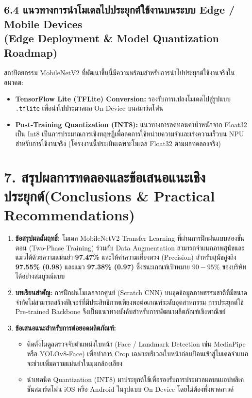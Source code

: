 \documentclass[12pt,a4paper]{article}
\begin{document}
\subsection*{6.4 แนวทางการนำโมเดลไปประยุกต์ใช้งานบนระบบ Edge / Mobile Devices\\ \normalsize(Edge Deployment \& Model Quantization Roadmap)}
สถาปัตยกรรม MobileNetV2 ที่พัฒนาขึ้นนี้มีความพร้อมสำหรับการนำไปประยุกต์ใช้งานจริงในอนาคต:
\begin{itemize}[leftmargin=1.8em, itemsep=0.5pt, topsep=1pt, parsep=0pt]
    \item \textbf{TensorFlow Lite (TFLite) Conversion:} รองรับการแปลงโมเดลไปสู่รูปแบบ \texttt{.tflite} เพื่อนำไปประมวลผล On-Device บนสมาร์ตโฟน
    \item \textbf{Post-Training Quantization (INT8):} แนวทางการลดทอนค่าน้ำหนักจาก Float32 เป็น Int8 เป็นการประมาณการเชิงทฤษฎีเพื่อลดการใช้หน่วยความจำและเร่งความเร็วบน NPU สำหรับการใช้งานจริง (โครงงานนี้ประเมินเฉพาะโมเดล Float32 ตามผลทดลองจริง)
\end{itemize}

\vspace{0.2em}
\section*{7. สรุปผลการทดลองและข้อเสนอแนะเชิงประยุกต์\newline \large(Conclusions \& Practical Recommendations)}

\begin{enumerate}[leftmargin=1.8em, itemsep=0.5pt, topsep=1pt, parsep=0pt]
    \item \textbf{ข้อสรุปผลสัมฤทธิ์:} โมเดล MobileNetV2 Transfer Learning ที่ผ่านการฝึกฝนแบบสองขั้นตอน (Two-Phase Training) ร่วมกับ Data Augmentation สามารถจำแนกภาพสุนัขและแมวได้ด้วยความแม่นยำ \textbf{97.47\%} และให้ค่าความเที่ยงตรง (Precision) สำหรับสุนัขสูงถึง \textbf{97.55\% (0.98)} และแมว \textbf{97.38\% (0.97)} ซึ่งชนะเกณฑ์เป้าหมาย $90 - 95\%$ ของบริษัทได้อย่างสมบูรณ์แบบ
    \item \textbf{บทเรียนสำคัญ:} การฝึกฝนโมเดลจากศูนย์ (Scratch CNN) บนชุดข้อมูลภาพธรรมชาติที่มีขนาดจำกัดไม่สามารถสร้างฟีเจอร์ที่มีประสิทธิภาพเพียงพอต่อเกณฑ์ระดับอุตสาหกรรม การประยุกต์ใช้ Pre-trained Backbone จึงเป็นแนวทางบังคับสำหรับการพัฒนาผลิตภัณฑ์เชิงพาณิชย์
    \item \textbf{ข้อเสนอแนะสำหรับการต่อยอดผลิตภัณฑ์:}
    \begin{itemize}[leftmargin=1.5em, itemsep=0.5pt, topsep=0.5pt, parsep=0pt]
        \item ติดตั้งโมดูลตรวจจับตำแหน่งใบหน้า (Face / Landmark Detection เช่น MediaPipe หรือ YOLOv8-Face) เพื่อทำการ Crop เฉพาะบริเวณใบหน้าก่อนป้อนเข้าสู่โมเดลจำแนก จะช่วยเพิ่มความแม่นยำในมุมกล้องเอียง
        \item นำเทคนิค Quantization (INT8) มาประยุกต์ใช้เพื่อรองรับการประมวลผลบนแอปพลิเคชันสมาร์ตโฟน iOS หรือ Android ในรูปแบบ On-\allowbreak{}Device โดยไม่ต้องพึ่งพาคลาวด์
    \end{itemize}
\end{enumerate}
\end{document}
